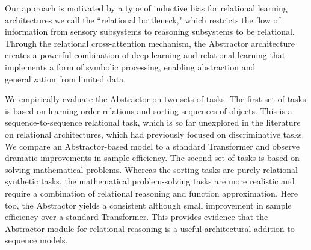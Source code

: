 Our approach is motivated by a type of inductive bias for relational learning architectures we call the
``relational bottleneck," 
which restricts the flow of information from sensory subsystems to  
reasoning subsystems to be relational. 
Through the relational cross-attention mechanism, the Abstractor architecture
creates a powerful combination of deep learning and relational learning that implements a form of symbolic processing, enabling abstraction and generalization from limited data.

We empirically evaluate the Abstractor on two sets of tasks. The first set of tasks is based on learning order relations and sorting sequences of objects. This is a sequence-to-sequence relational task, which is so far unexplored in the literature on relational architectures, which had 
previously focused on discriminative tasks. We compare an Abstractor-based model to a standard Transformer and observe dramatic improvements in sample efficiency. The second set of tasks is based on solving mathematical problems. Whereas the sorting tasks are purely relational synthetic tasks, the mathematical problem-solving tasks are more realistic and require a combination of relational reasoning and function approximation. Here too, the Abstractor yields a consistent although small improvement in sample efficiency over a standard Transformer. This provides
evidence that the Abstractor module for relational reasoning is a useful architectural addition to sequence models. 

